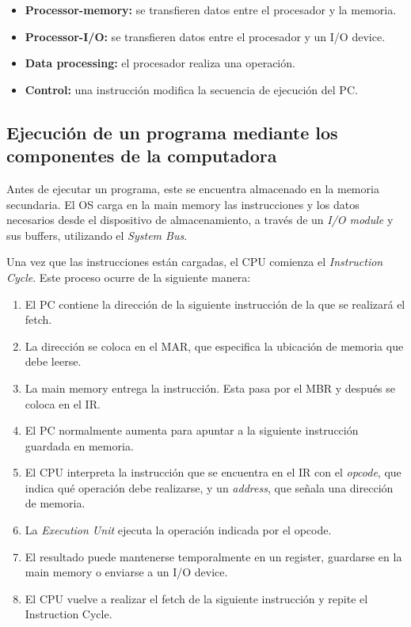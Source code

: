 \documentclass[12pt,oneside]{template/liverpoolthesis}
\begin{document}
\begin{itemize}
    \item \textbf{Processor-memory:} se transfieren datos entre el procesador y la memoria.

    \item \textbf{Processor-I/O:} se transfieren datos entre el procesador y un I/O device.

    \item \textbf{Data processing:} el procesador realiza una operación.

    \item \textbf{Control:} una instrucción modifica la secuencia de ejecución del PC.
\end{itemize}

\subsection{Ejecución de un programa mediante los componentes de la computadora}

Antes de ejecutar un programa, este se encuentra almacenado en la memoria
secundaria. El OS carga en
la main memory las instrucciones y los datos necesarios desde el dispositivo de almacenamiento, a través de
un \textit{I/O module} y sus buffers, utilizando el \textit{System Bus}.

Una vez que las instrucciones están cargadas, el CPU comienza
el \textit{Instruction Cycle}. Este proceso ocurre de la siguiente manera:

\begin{enumerate}
    \item El PC contiene la dirección de la siguiente
    instrucción de la que se realizará el fetch.

    \item La dirección se coloca en el MAR,
    que especifica la ubicación de memoria que debe leerse.

    \item La main memory entrega la instrucción. Esta pasa por el
    MBR y después se coloca en el
    IR.

    \item El PC normalmente aumenta para apuntar a la siguiente instrucción
    guardada en memoria.

    \item El CPU interpreta la instrucción que se encuentra en el IR con el 
    \textit{opcode}, que indica qué operación debe realizarse, y un
    \textit{address}, que señala una dirección de memoria.

    \item La \textit{Execution Unit} ejecuta la operación indicada por el
    opcode. 

    \item El resultado puede mantenerse temporalmente en un register, guardarse
    en la main memory o enviarse a un I/O device.

    \item El CPU vuelve a realizar el fetch de la siguiente instrucción y
    repite el Instruction Cycle.
\end{enumerate}
\end{document}

